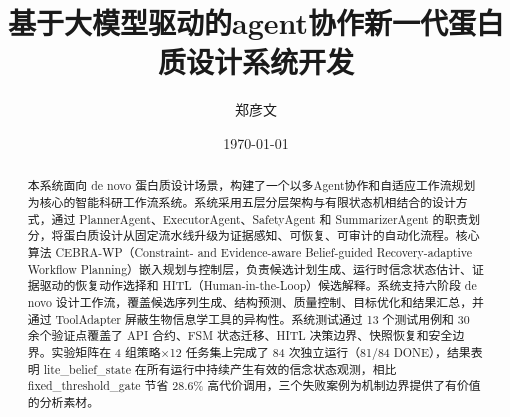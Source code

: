 \documentclass[12pt,a4paper]{ctexart}
\title{基于大模型驱动的agent协作新一代蛋白质设计系统开发}
\author{郑彦文}
\date{\today}
\begin{document}
\maketitle

\begin{abstract}
本系统面向 de novo 蛋白质设计场景，构建了一个以多Agent协作和自适应工作流规划为核心的智能科研工作流系统。系统采用五层分层架构与有限状态机相结合的设计方式，通过 PlannerAgent、ExecutorAgent、SafetyAgent 和 SummarizerAgent 的职责划分，将蛋白质设计从固定流水线升级为证据感知、可恢复、可审计的自动化流程。核心算法 CEBRA-WP（Constraint- and Evidence-aware Belief-guided Recovery-adaptive Workflow Planning）嵌入规划与控制层，负责候选计划生成、运行时信念状态估计、证据驱动的恢复动作选择和 HITL（Human-in-the-Loop）候选解释。系统支持六阶段 de novo 设计工作流，覆盖候选序列生成、结构预测、质量控制、目标优化和结果汇总，并通过 ToolAdapter 屏蔽生物信息学工具的异构性。系统测试通过 13 个测试用例和 30 余个验证点覆盖了 API 合约、FSM 状态迁移、HITL 决策边界、快照恢复和安全边界。实验矩阵在 4 组策略×12 任务集上完成了 84 次独立运行（81/84 DONE），结果表明 lite\_belief\_state 在所有运行中持续产生有效的信念状态观测，相比 fixed\_threshold\_gate 节省 28.6\% 高代价调用，三个失败案例为机制边界提供了有价值的分析素材。
\end{abstract}

\tableofcontents
\newpage



















\end{document}
